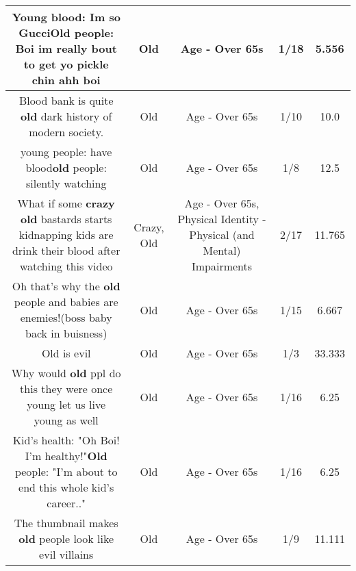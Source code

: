 \documentclass[11pt]{article}
\newlength\mylength
\begin{document}
\begin{center}
\begin{longtable}{|C{.65\mylength}|C{.30\mylength}|C{.12\mylength}|C{.12\mylength}|C{.12\mylength}|}
  \small Young blood: Im so Gucci\textbf{Old} people: Boi im really bout to get yo pickle chin ahh boi\normalsize   & Old & Age - Over 65s & 1/18 & 5.556 \\  \hline
  \small Blood bank is quite \textbf{old} dark history of modern society.\normalsize   & Old & Age - Over 65s & 1/10 & 10.0 \\  \hline
  \small young people: have blood\textbf{old} people: silently watching\normalsize   & Old & Age - Over 65s & 1/8 & 12.5 \\  \hline
  \small What if some \textbf{crazy} \textbf{old} bastards starts kidnapping kids are drink their blood after watching this video\normalsize   & Crazy, Old & Age - Over 65s, Physical Identity - Physical (and Mental) Impairments & 2/17 & 11.765 \\  \hline
  \small Oh that's why the \textbf{old} people and babies are enemies!(boss baby back in buisness)\normalsize   & Old & Age - Over 65s & 1/15 & 6.667 \\  \hline
  \small Old is evil\normalsize   & Old & Age - Over 65s & 1/3 & 33.333 \\  \hline
  \small Why would \textbf{old} ppl do this they were once young let us live young as well\normalsize   & Old & Age - Over 65s & 1/16 & 6.25 \\  \hline
  \small Kid's health: "Oh Boi! I'm healthy!"\textbf{Old} people: "I'm about to end this whole kid's career.."\normalsize   & Old & Age - Over 65s & 1/16 & 6.25 \\  \hline
  \small The thumbnail makes \textbf{old} people look like evil villains\normalsize   & Old & Age - Over 65s & 1/9 & 11.111 \\  \hline

\end{longtable}
\end{center}
\end{document}
